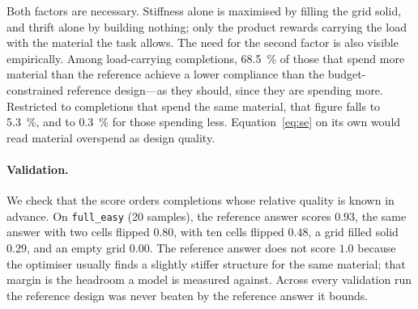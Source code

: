Both factors are necessary. Stiffness alone is maximised by filling the grid
solid, and thrift alone by building nothing; only the product rewards carrying
the load with the material the task allows. The need for the second factor is
also visible empirically. Among load-carrying completions, \SI{68.5}{\percent}
of those that spend more material than the reference achieve a lower compliance
than the budget-constrained reference design---as they should, since they are
spending more. Restricted to completions that spend the same material, that
figure falls to \SI{5.3}{\percent}, and to \SI{0.3}{\percent} for those spending
less. Equation~\eqref{eq:se} on its own would read material overspend as design
quality.

\paragraph{Validation.}
We check that the score orders completions whose relative quality is known in
advance. On \texttt{full\_easy} (20 samples), the reference answer scores
$0.93$, the same answer with two cells flipped $0.80$, with ten cells flipped
$0.48$, a grid filled solid $0.29$, and an empty grid $0.00$. The reference
answer does not score $1.0$ because the optimiser usually finds a slightly
stiffer structure for the same material; that margin is the headroom a model is
measured against. Across every validation run the reference design was never
beaten by the reference answer it bounds.
